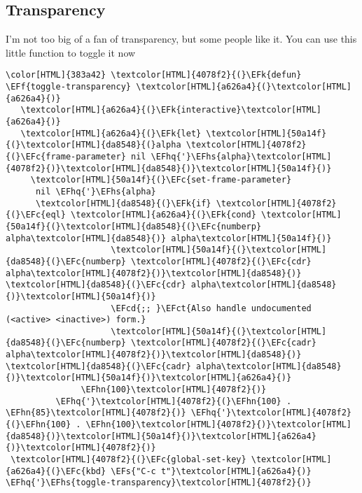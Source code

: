 \documentclass{scrartcl}
\newcommand{\EFk}[1]{\textcolor{EFk}{#1}} %
\newcommand{\EFs}[1]{\textcolor{EFs}{#1}} %
\newcommand{\EFct}[1]{\textcolor{EFct}{#1}} %
\newcommand{\EFc}[1]{\textcolor{EFc}{#1}} %
\newcommand{\EFf}[1]{\textcolor{EFf}{#1}} %
\newcommand{\EFcd}[1]{\textcolor{EFcd}{#1}} %
\newcommand{\EFhn}[1]{\textcolor{EFhn}{\textbf{#1}}} %
\newcommand{\EFhq}[1]{\textcolor{EFhq}{#1}} %
\newcommand{\EFhs}[1]{\textcolor{EFhs}{#1}} %
\begin{document}
\subsection{Transparency}
\label{sec:orga58eab9}
I'm not too big of a fan of transparency, but some people like it. You can use
this little function to toggle it now
\begin{Code}
\begin{Verbatim}[]
\color[HTML]{383a42} \textcolor[HTML]{4078f2}{(}\EFk{defun} \EFf{toggle-transparency} \textcolor[HTML]{a626a4}{(}\textcolor[HTML]{a626a4}{)}
   \textcolor[HTML]{a626a4}{(}\EFk{interactive}\textcolor[HTML]{a626a4}{)}
   \textcolor[HTML]{a626a4}{(}\EFk{let} \textcolor[HTML]{50a14f}{(}\textcolor[HTML]{da8548}{(}alpha \textcolor[HTML]{4078f2}{(}\EFc{frame-parameter} nil \EFhq{'}\EFhs{alpha}\textcolor[HTML]{4078f2}{)}\textcolor[HTML]{da8548}{)}\textcolor[HTML]{50a14f}{)}
     \textcolor[HTML]{50a14f}{(}\EFc{set-frame-parameter}
      nil \EFhq{'}\EFhs{alpha}
      \textcolor[HTML]{da8548}{(}\EFk{if} \textcolor[HTML]{4078f2}{(}\EFc{eql} \textcolor[HTML]{a626a4}{(}\EFk{cond} \textcolor[HTML]{50a14f}{(}\textcolor[HTML]{da8548}{(}\EFc{numberp} alpha\textcolor[HTML]{da8548}{)} alpha\textcolor[HTML]{50a14f}{)}
                     \textcolor[HTML]{50a14f}{(}\textcolor[HTML]{da8548}{(}\EFc{numberp} \textcolor[HTML]{4078f2}{(}\EFc{cdr} alpha\textcolor[HTML]{4078f2}{)}\textcolor[HTML]{da8548}{)} \textcolor[HTML]{da8548}{(}\EFc{cdr} alpha\textcolor[HTML]{da8548}{)}\textcolor[HTML]{50a14f}{)}
                     \EFcd{;; }\EFct{Also handle undocumented (<active> <inactive>) form.}
                     \textcolor[HTML]{50a14f}{(}\textcolor[HTML]{da8548}{(}\EFc{numberp} \textcolor[HTML]{4078f2}{(}\EFc{cadr} alpha\textcolor[HTML]{4078f2}{)}\textcolor[HTML]{da8548}{)} \textcolor[HTML]{da8548}{(}\EFc{cadr} alpha\textcolor[HTML]{da8548}{)}\textcolor[HTML]{50a14f}{)}\textcolor[HTML]{a626a4}{)}
               \EFhn{100}\textcolor[HTML]{4078f2}{)}
          \EFhq{'}\textcolor[HTML]{4078f2}{(}\EFhn{100} . \EFhn{85}\textcolor[HTML]{4078f2}{)} \EFhq{'}\textcolor[HTML]{4078f2}{(}\EFhn{100} . \EFhn{100}\textcolor[HTML]{4078f2}{)}\textcolor[HTML]{da8548}{)}\textcolor[HTML]{50a14f}{)}\textcolor[HTML]{a626a4}{)}\textcolor[HTML]{4078f2}{)}
 \textcolor[HTML]{4078f2}{(}\EFc{global-set-key} \textcolor[HTML]{a626a4}{(}\EFc{kbd} \EFs{"C-c t"}\textcolor[HTML]{a626a4}{)} \EFhq{'}\EFhs{toggle-transparency}\textcolor[HTML]{4078f2}{)}
\end{Verbatim}
\end{Code}
\end{document}
